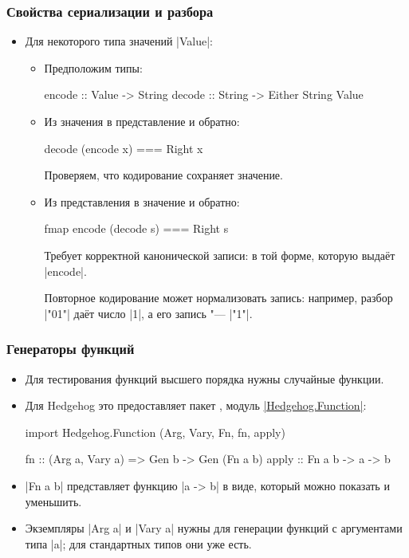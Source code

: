 \documentclass[11pt]{beamer}
\begin{document}
\begin{frame}[fragile]
  \frametitle{Свойства сериализации и разбора}
  \begin{itemize}
    \item Для некоторого типа значений \haskinline|Value|:
          \begin{itemize}
            \item Предположим типы:
                  \begin{haskellsmall}
                    encode :: Value -> String
                    decode :: String -> Either String Value
                  \end{haskellsmall}
            \item Из значения в представление и обратно:
                  \begin{haskellsmall}
                    decode (encode x) === Right x
                  \end{haskellsmall}
                  Проверяем, что кодирование сохраняет значение.
                  \pause
            \item Из представления в значение и обратно:
                  \begin{haskellsmall}
                    fmap encode (decode s) === Right s
                  \end{haskellsmall}
                  Требует корректной канонической записи: в той форме, которую выдаёт \haskinline|encode|.

                  Повторное кодирование может нормализовать запись: например, разбор \haskinline|"01"| даёт число \haskinline|1|, а его запись "--- \haskinline|"1"|.
          \end{itemize}
  \end{itemize}
\end{frame}

\begin{frame}[fragile]
  \frametitle{Генераторы функций}
  \begin{itemize}
    \item Для тестирования функций высшего порядка нужны случайные функции.
    \item Для Hedgehog это предоставляет пакет , модуль \href{https://hackage.haskell.org/package/hedgehog-fn/docs/Hedgehog-Function.html}{\haskinline|Hedgehog.Function|}:
          \begin{haskellsmall}
            import Hedgehog.Function
              (Arg, Vary, Fn, fn, apply)

            fn :: (Arg a, Vary a) => Gen b -> Gen (Fn a b)
            apply :: Fn a b -> a -> b
          \end{haskellsmall}
    \item \haskinline|Fn a b| представляет функцию \haskinline|a -> b| в виде, который можно показать и уменьшить.
    \item Экземпляры \haskinline|Arg a| и \haskinline|Vary a| нужны для генерации функций с аргументами типа \haskinline|a|; для стандартных типов они уже есть.
  \end{itemize}
\end{frame}
\end{document}
